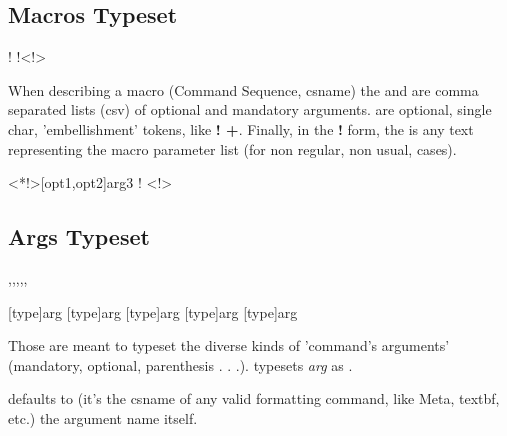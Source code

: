 \documentclass[dctools,english]{ufrgscca}
\begin{document}
\subsection{Macros Typeset}
\begin{Macros}{\Macro}
	\begin{Syntax}%
		\Macro!{\Macro}{}
		\Macro!{\Macro}<!>{}
	\end{Syntax}
	When describing a macro  (Command Sequence, csname) the  and  are comma separated lists (csv) of optional and mandatory arguments.  are optional, single char,  'embellishment' tokens, like {\bfseries * ! +}. Finally, in the {\bfseries !} form, the  is any text representing the macro parameter list (for non regular, non usual, cases).

	\begin{stcode}[st=demoB]
		\Macro
		{\Macro}<*!>[opt1,opt2]{arg3}
		\Macro!
		{\Macro}<!>{\marg{par.desc.}}
\end{stcode}
	\TabbedDemoCode{demoB}
\end{Macros}

\subsection{Args  Typeset}
\begin{Macros}{\oarg,\marg,\parg,\xarg,\Arg,\Meta}
	\begin{Syntax}%
		\Macro{\oarg}[type]{arg}
		\Macro{\marg}[type]{arg}
		\Macro{\parg}[type]{arg}
		\Macro{\xarg}[type]{arg}
		\Macro{\Arg}[type]{arg}
		\Macro{\Meta}{arg}
	\end{Syntax}
	Those are meant to typeset the diverse kinds of 'command's arguments' (mandatory, optional, parenthesis . . .).  typesets \emph{arg} as .
	\begin{Args}
		 defaults to  (it's the csname of any valid formatting command, like Meta, textbf, etc.)
		 the argument name itself.
	\end{Args}
	\begin{stcode}[st=demoA]
\end{stcode}
\end{Macros}
\end{document}
